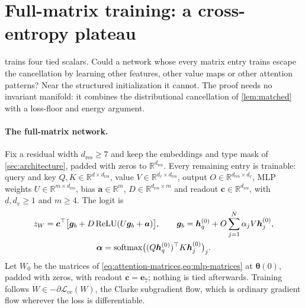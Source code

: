 \section{Full-matrix training: a cross-entropy plateau}
\label{sec:fullmatrix}
 trains four tied scalars. Could a network whose every matrix entry trains escape the cancellation by learning other features,
other value maps or other attention patterns? Near the structured initialization it cannot. The proof needs no invariant manifold:
it combines the distributional cancellation of \cref{lem:matched} with a loss-floor and energy argument.

\paragraph{The full-matrix network.} Fix a residual width $d_{\mathrm{res}}\ge7$ and keep the embeddings and type mask of \cref{sec:architecture}, padded with
zeros to $\mathbb R^{d_{\mathrm{res}}}$. Every remaining entry is trainable: query and key $Q,K\in\mathbb R^{d\times d_{\mathrm{res}}}$, value $V\in\mathbb R^{d_v\times d_{\mathrm{res}}}$,
output $O\in\mathbb R^{d_{\mathrm{res}}\times d_v}$, MLP weights $U\in\mathbb R^{m\times d_{\mathrm{res}}}$, bias $\bm a\in\mathbb R^m$, $D\in\mathbb R^{d_{\mathrm{res}}\times m}$ and readout $\bm c\in\mathbb R^{d_{\mathrm{res}}}$,
with $d,d_v\ge1$ and $m\ge4$. The logit is
\begin{gather*}
 z_W=\bm c^\top\bigl[\bm g_b+D\operatorname{ReLU}(U\bm g_b+\bm a)\bigr],\qquad
 \bm g_b=\bm h_q^{(0)}+O\sum_{j=1}^N\alpha_jV\bm h_j^{(0)},\\
 \bm\alpha=\operatorname{softmax}\bigl((Q\bm h_q^{(0)})^\top K\bm h_j^{(0)}\bigr)_j .
\end{gather*}
Let $W_0$ be the matrices of \cref{eq:attention-matrices,eq:mlp-matrices} at $\bm\theta(0)$, padded with zeros, with readout $\bm c=\bm e_7$; nothing is tied afterwards.
Training follows $\dot W\in-\partial\mathcal L_{\mathrm{ce}}(W)$, the Clarke subgradient flow, which is ordinary gradient flow wherever the loss is differentiable.

